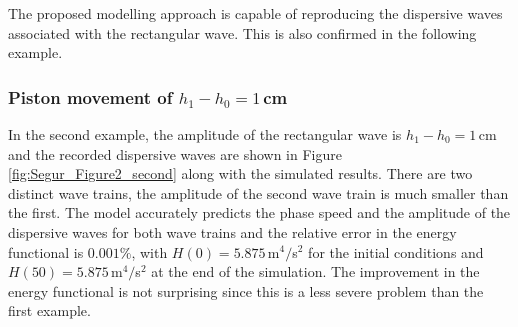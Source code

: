 \documentclass[preprint,sort&compress,1p]{article}
\begin{document}
The proposed modelling approach is capable of reproducing the dispersive waves associated with the rectangular wave. This is also confirmed in the following example.

\subsubsection{Piston movement of  $h_1 - h_0 = 1$\,cm}

In the second example, the amplitude of the rectangular wave is $h_1 - h_0 = 1$\,cm and the recorded dispersive waves are shown in Figure \ref{fig:Segur_Figure2_second} along with the simulated results. There are two distinct wave trains, the amplitude of the second wave train is much smaller than the first. The model accurately predicts the phase speed and the amplitude of the dispersive waves for both wave trains and the relative error in the energy functional is $0.001\%$, with $H(0) = 5.875$\,m$^4/$s$^2$ for the initial conditions and $H(50) = 5.875$\,m$^4/$s$^2$ at the end of the simulation. The improvement in the energy functional is not surprising since this is a less severe problem than the first example.
\end{document}
